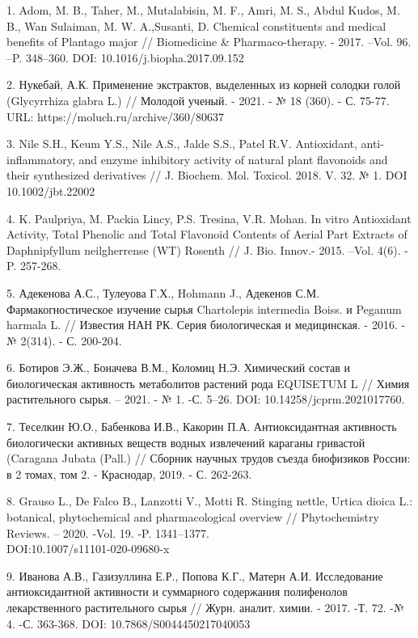 \begin{references}
1. Adom, M. B., Taher, M., Mutalabisin, M. F., Amri, M. S., Abdul Kudos,
M. B., Wan Sulaiman, M. W. A.,Susanti, D. Chemical constituents and
medical benefits of Plantago major // Biomedicine \& Pharmaco-therapy.
- 2017. --Vol. 96. --P. 348--360. DOI: 10.1016/j.biopha.2017.09.152

2. Нукебай, А.К. Применение экстрактов, выделенных из корней солодки
голой (Glycyrrhiza glabra L.) // Молодой ученый. - 2021. - № 18 (360).
- С. 75-77. URL: https://moluch.ru/archive/360/80637

3. Nile S.H., Keum Y.S., Nile A.S., Jalde S.S., Patel R.V. Antioxidant,
anti-inflammatory, and enzyme inhibitory activity of natural plant
flavonoids and their synthesized derivatives // J. Biochem. Mol.
Toxicol. 2018. V. 32. № 1. DOI 10.1002/jbt.22002

4. K. Paulpriya, M. Packia Lincy, P.S. Tresina, V.R. Mohan. In vitro
Antioxidant Activity, Total Phenolic and Total Flavonoid Contents of
Aerial Part Extracts of Daphnipfyllum neilgherrense (WT) Rosenth // J.
Bio. Innov.- 2015. --Vol. 4(6). - P. 257-268.

5. Адекенова А.С., Тулеуова Г.Х., Hohmann J., Адекенов С.М.
Фармакогностическое изучение сырья Chartolepis intermedia Boiss. и
Peganum harmala L. // Известия НАН РК. Серия биологическая и
медицинская. - 2016. - № 2(314). - С. 200-204.

6. Ботиров Э.Ж., Боначева В.М., Коломиц Н.Э. Химический состав и
биологическая активность метаболитов растений рода EQUISETUM L //
Химия растительного сырья. -- 2021. - № 1. -С. 5--26. DOI:
10.14258/jcprm.2021017760.

7. Теселкин Ю.О., Бабенкова И.В., Какорин П.А. Антиоксидантная активность
биологически активных веществ водных извлечений караганы гривастой
(Caragana Jubata (Pall.) // Сборник научных трудов съезда биофизиков
России: в 2 томах, том 2. - Краснодар, 2019. - С. 262-263.

8. Grauso L., De Falco B., Lanzotti V., Motti R. Stinging nettle, Urtica
dioica L.: botanical, phytochemical and pharmacological overview //
Phytochemistry Reviews. -- 2020. -Vol. 19. -P. 1341--1377.
\\DOI:10.1007/s11101-020-09680-x

9. Иванова А.В., Газизуллина Е.Р., Попова К.Г., Матерн А.И. Исследование
антиоксидантной активности и суммарного содержания полифенолов
лекарственного растительного сырья // Журн. аналит. химии. - 2017. -Т.
72. -№ 4. -С. 363-368. DOI: 10.7868/S0044450217040053


\end{references}
